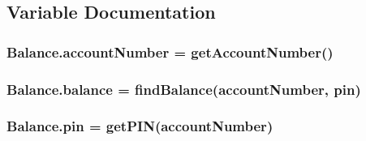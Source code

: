 \subsection{Variable Documentation}
\subsubsection[{\texorpdfstring{account\+Number}{accountNumber}}]{\setlength{\rightskip}{0pt plus 5cm}Balance.\+account\+Number = {\bf get\+Account\+Number}()}\hypertarget{namespaceBalance_a526eb4cc966158b4a4d3b8d33c04340f}{}\label{namespaceBalance_a526eb4cc966158b4a4d3b8d33c04340f}
\subsubsection[{\texorpdfstring{balance}{balance}}]{\setlength{\rightskip}{0pt plus 5cm}Balance.\+balance = {\bf find\+Balance}({\bf account\+Number}, {\bf pin})}\hypertarget{namespaceBalance_a3a307687cae8694689c16220a9bb081c}{}\label{namespaceBalance_a3a307687cae8694689c16220a9bb081c}
\subsubsection[{\texorpdfstring{pin}{pin}}]{\setlength{\rightskip}{0pt plus 5cm}Balance.\+pin = {\bf get\+P\+IN}({\bf account\+Number})}\hypertarget{namespaceBalance_a4cfe14f6e735fe18092e9809e4886137}{}\label{namespaceBalance_a4cfe14f6e735fe18092e9809e4886137}
